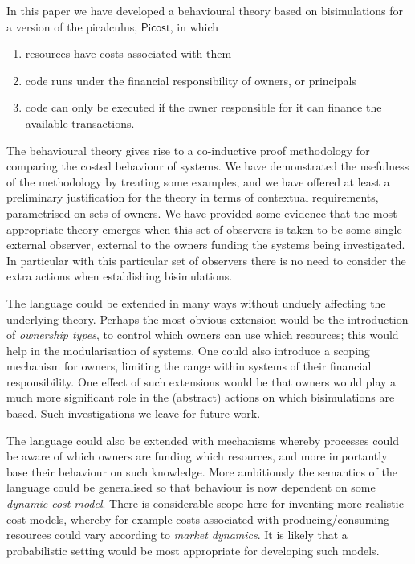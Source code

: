\documentclass{LMCS}
\newcommand{\pfn}[1]{\mathsf{#1}}  \newcommand{\cfn}[1]{\mathsf{#1}}  \newcommand{\ownfnt}[1]{{\mathsf{#1}}}
\newcommand{\picost}{\ensuremath{\pfn{Picost}}\xspace}
\begin{document}
In this paper we have developed a behavioural theory based on
bisimulations for a version of the picalculus, \picost, in which
\begin{enumerate}[]
\item resources have costs associated with them
\item code runs under the financial responsibility of owners, or principals
\item code can only be executed if the owner responsible for it can finance
the available transactions.
\end{enumerate}
The behavioural theory gives rise to a  co-inductive
proof methodology for comparing the costed behaviour of systems.  We
have demonstrated the usefulness of the methodology by treating some
examples, and we have offered at least a preliminary justification for
the theory in terms of contextual requirements, parametrised on sets of
owners. We have provided some evidence that the most appropriate theory 
emerges when this set of observers is taken to be some single external
observer, external to the owners funding the systems being investigated. 
In particular with this particular set of observers there is no need 
to consider the extra actions  when establishing 
bisimulations. 

The language could be extended in many ways without unduely affecting
the underlying theory.  Perhaps the most obvious extension would be
the introduction of \emph{ownership types}, to control which owners
can use which resources; this would help in the modularisation of
systems. One could also introduce a scoping mechanism for owners,
limiting the range within systems of their financial responsibility. 
One effect of such  extensions would be that owners would play
a much more significant role in the (abstract) actions on which
bisimulations are based. Such investigations we leave for future work. 

The language could also be extended with mechanisms whereby processes
could be aware of which owners are funding which resources, and more
importantly base their behaviour on such knowledge. More ambitiously
the semantics of the language could be generalised so that behaviour is 
now dependent on some  \emph{dynamic cost model}. There is considerable 
scope here for inventing more realistic cost models, whereby for example 
costs associated with producing/consuming resources could vary according to
\emph{market dynamics}. It is likely that a probabilistic setting would be
most appropriate for developing such models. 
\end{document}
